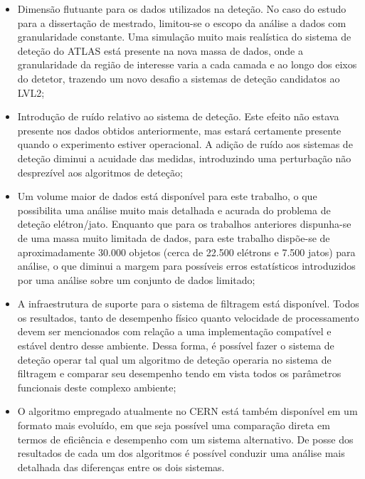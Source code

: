 \begin{itemize}
\item Dimensão flutuante para os dados utilizados na deteção. No caso do
estudo para a dissertação de mestrado, limitou-se o escopo da análise a dados
com granularidade constante. Uma simulação muito mais realística do sistema de
deteção do ATLAS está presente na nova massa de dados, onde a granularidade da
região de interesse varia a cada camada e ao longo dos eixos do detetor,
trazendo um novo desafio a sistemas de deteção candidatos ao LVL2;

\item Introdução de ruído relativo ao sistema de deteção. Este efeito não
estava presente nos dados obtidos anteriormente, mas estará certamente
presente quando o experimento estiver operacional. A adição de ruído aos
sistemas de deteção diminui a acuidade das medidas, introduzindo uma
perturbação não desprezível aos algoritmos de deteção;

\item Um volume maior de dados está disponível para este trabalho, o que
possibilita uma análise muito mais detalhada e acurada do problema de deteção
elétron/jato. Enquanto que para os trabalhos anteriores dispunha-se de uma
massa muito limitada de dados, para este trabalho dispõe-se de aproximadamente
30.000 objetos (cerca de 22.500 elétrons e 7.500 jatos) para análise, o que
diminui a margem para possíveis erros estatísticos introduzidos por uma
análise sobre um conjunto de dados limitado;

\item A infraestrutura de suporte para o sistema de filtragem está
disponível. Todos os resultados, tanto de desempenho físico quanto velocidade
de processamento devem ser mencionados com relação a uma implementação
compatível e estável dentro desse ambiente. Dessa forma, é possível fazer o
sistema de deteção operar tal qual um algoritmo de deteção operaria no sistema
de filtragem e comparar seu desempenho tendo em vista todos os parâmetros
funcionais deste complexo ambiente;

\item O algoritmo empregado atualmente no CERN está também disponível em um
formato mais evoluído, em que seja possível uma comparação direta em termos de
eficiência e desempenho com um sistema alternativo. De posse dos resultados de
cada um dos algoritmos é possível conduzir uma análise mais detalhada das
diferenças entre os dois sistemas.
\end{itemize}

